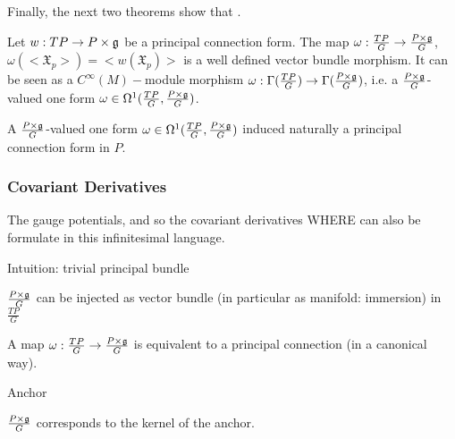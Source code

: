 Finally, the next two theorems show that .

\begin{theorem}
Let $w:TP \to P \times \mathfrak{g}$ be a principal connection form. The map $\omega: \frac{TP}{G} \to \frac{P \times \mathfrak{g}}{G}$, $\omega(<\mathfrak{X}_p>) = <w(\mathfrak{X}_p)>$ is a well defined vector bundle morphism. It can be seen as a $C^\infty(M)-$module morphism $\omega: \Gamma(\frac{TP}{G}) \to \Gamma(\frac{P \times \mathfrak{g}}{G})$, i.e. a $\frac{P \times \mathfrak{g}}{G}$-valued one form $\omega \in \Omega^1(\frac{TP}{G}, \frac{P \times \mathfrak{g}}{G})$.
\end{theorem}

\begin{theorem}
A $\frac{P \times \mathfrak{g}}{G}$-valued one form $\omega \in \Omega^1(\frac{TP}{G}, \frac{P \times \mathfrak{g}}{G})$ induced naturally a principal connection form in $P$.
\end{theorem}

\subsubsection{Covariant Derivatives}

The gauge potentials, and so the covariant derivatives WHERE can also be formulate in this infinitesimal language. 

Intuition: trivial principal bundle



\begin{proposition}
$\frac{P \times \mathfrak{g}}{G}$ can be injected as vector bundle (in particular as manifold: immersion) in $\frac{TP}{G}$
\end{proposition}

\begin{theorem}
A map $\omega:\frac{TP}{G} \to \frac{P \times \mathfrak{g}}{G}$ is equivalent to a principal connection (in a canonical way).
\end{theorem}

\begin{definition}
Anchor
\end{definition}

\begin{proposition}
$\frac{P \times \mathfrak{g}}{G}$ corresponds to the kernel of the anchor.
\end{proposition}

